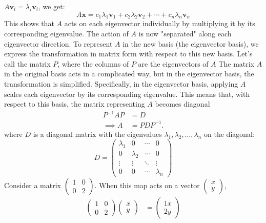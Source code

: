 \documentclass{report}
\begin{document}
\begin{itemize}
            \( A \mathbf{v}_i = \lambda_i \mathbf{v}_i \), we get:
            \[
                A \mathbf{x} = c_1 \lambda_1 \mathbf{v}_1 + c_2 \lambda_2 \mathbf{v}_2 + \cdots + c_n \lambda_n \mathbf{v}_n
            \]
            This shows that \( A \) acts on each eigenvector individually by multiplying 
            it by its corresponding eigenvalue. The action of \( A \) is now "separated" 
            along each eigenvector direction.
            \bigbreak \noindent 
            To represent $A$ in the new basis (the eigenvector basis), we express the transformation in matrix form with respect to this new basis. Let’s call the matrix $P$, where the columns of $P$ are the eigenvectors of $A$
            \bigbreak \noindent 
            The matrix $A$ in the original basis acts in a complicated way, but in the eigenvector basis, the transformation is simplified. Specifically, in the eigenvector basis, applying $A$ scales each eigenvector by its corresponding eigenvalue. This means that, with respect to this basis, the matrix representing $A$ becomes diagonal
            \bigbreak \noindent 
            \begin{align*}
                P^{-1}AP &= D \\
                \implies  A &= PDP^{-1}
            .\end{align*}
            \bigbreak \noindent 
            where \( D \) is a diagonal matrix with the eigenvalues \( \lambda_1, \lambda_2, \dots, \lambda_n \) on the diagonal:
            \[
                D = \begin{pmatrix}
                    \lambda_1 & 0 & \cdots & 0 \\
                    0 & \lambda_2 & \cdots & 0 \\
                    \vdots & \vdots & \ddots & \vdots \\
                    0 & 0 & \cdots & \lambda_n
                \end{pmatrix}
            \]
            \bigbreak \noindent 
            Consider a matrix $\begin{pmatrix} 1 & 0 \\ 0 & 2 \end{pmatrix}$. When this map acts on a vector $\begin{pmatrix} x \\ y \end{pmatrix}$,
            \begin{align*}
                \begin{pmatrix} 1 & 0 \\ 0 & 2 \end{pmatrix} \begin{pmatrix} x \\ y\end{pmatrix} &= \begin{pmatrix} 1x \\ 2y\end{pmatrix}

\end{align*}
\end{itemize}
\end{document}
